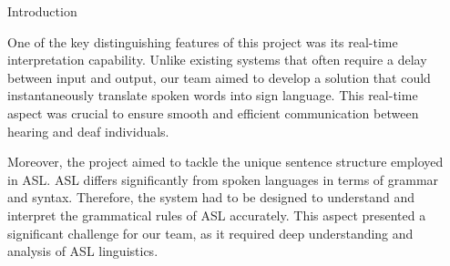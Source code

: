 \documentclass[final, 20pt]{beamer}
\newlength{\colwidth}
\newlength{\twocolwidth}
\begin{document}
\begin{frame}[t]
\begin{columns}[t]
\begin{column}{\twocolwidth}
\end{column}

\separatorcolumn

\begin{column}{\twocolwidth}
  \begin{block}{Introduction}
    \begin{multicols}{2}


      One of the key distinguishing features of this project was its real-time interpretation capability. Unlike existing systems that often require a delay between input and output, our team aimed to develop a solution that could instantaneously translate spoken words into sign language. This real-time aspect was crucial to ensure smooth and efficient communication between hearing and deaf individuals.

      Moreover, the project aimed to tackle the unique sentence structure employed in ASL. ASL differs significantly from spoken languages in terms of grammar and syntax. Therefore, the system had to be designed to understand and interpret the grammatical rules of ASL accurately. This aspect presented a significant challenge for our team, as it required deep understanding and analysis of ASL linguistics.


\end{multicols}
\end{block}
\end{column}
\end{columns}
\end{frame}
\end{document}
